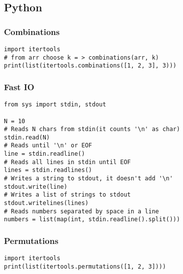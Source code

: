 \documentclass[twoside]{article}
\newcommand{\fileTitleStyle}{\large\underline}
\begin{document}
\begin{multicols*}{2}
\subsection*{Python}
\vspace{2em}
\subsubsectionfont{\centering\bfseries\Large}
\subsubsectionfont{\fileTitleStyle}
\subsubsection*{Combinations}
\begin{verbatim}
import itertools
# from arr choose k = > combinations(arr, k)
print(list(itertools.combinations([1, 2, 3], 3)))
\end{verbatim}

\subsubsectionfont{\centering\bfseries\Large}
\subsubsectionfont{\fileTitleStyle}
\subsubsection*{Fast IO}
\begin{verbatim}
from sys import stdin, stdout

N = 10
# Reads N chars from stdin(it counts '\n' as char)
stdin.read(N)
# Reads until '\n' or EOF
line = stdin.readline()
# Reads all lines in stdin until EOF
lines = stdin.readlines()
# Writes a string to stdout, it doesn't add '\n'
stdout.write(line)
# Writes a list of strings to stdout
stdout.writelines(lines)
# Reads numbers separated by space in a line
numbers = list(map(int, stdin.readline().split()))

\end{verbatim}

\subsubsectionfont{\centering\bfseries\Large}
\subsubsectionfont{\fileTitleStyle}
\subsubsection*{Permutations}
\begin{verbatim}
import itertools
print(list(itertools.permutations([1, 2, 3])))

\end{verbatim}

\subsubsectionfont{\centering\bfseries\Large}
\subsubsectionfont{\fileTitleStyle}

\end{multicols*}
\end{document}
